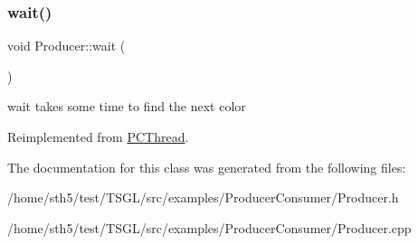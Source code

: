 \subsubsection{\texorpdfstring{wait()}{wait()}}
{\footnotesize\ttfamily void Producer\+::wait (\begin{DoxyParamCaption}{ }\end{DoxyParamCaption})\hspace{0.3cm}{\ttfamily [virtual]}}

wait takes some time to find the next color 

Reimplemented from \hyperlink{class_p_c_thread}{P\+C\+Thread}.



The documentation for this class was generated from the following files\+:\begin{DoxyCompactItemize}
\item 
/home/sth5/test/\+T\+S\+G\+L/src/examples/\+Producer\+Consumer/Producer.\+h\item 
/home/sth5/test/\+T\+S\+G\+L/src/examples/\+Producer\+Consumer/Producer.\+cpp\end{DoxyCompactItemize}
